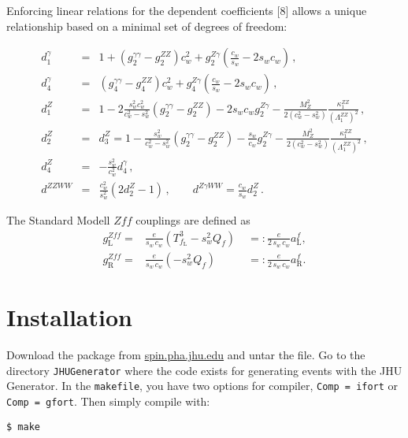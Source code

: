 \documentclass[aps,superscriptaddress,nofootinbib]{revtex4}
\begin{document}
Enforcing linear relations for the dependent coefficients [8] allows a unique relationship based on a minimal set of
degrees of freedom:

\begin{eqnarray}
  d_1^\gamma &=& 1 + (g_2^{\gamma\gamma}-g_2^{ZZ}) c_w^2  + g_2^{Z\gamma} \left(\frac{c_w}{s_w}-2s_w c_w \right)\,,
   \label{eq:d1}
  \\
  d_4^{\gamma} &=& (g_4^{\gamma\gamma}-g_4^{ZZ}) c_w^2 + g_4^{Z\gamma} \left( \frac{c_w}{s_w}-2 s_w c_w \right)\,,
   \label{eq:d2}
  \\
  d_1^Z &=& 1 -2 \frac{s_w^2 c_w^2}{c_w^2-s_w^2} \left(g_2^{\gamma\gamma}  -g_2^{ZZ} \right) -2 s_w c_w g_2^{Z\gamma} - \frac{M_Z^2}{2 (c_w^2-s_w^2) }  \frac{\kappa_1^{ZZ}}{(\Lambda_1^{ZZ})^2}\,,
   \label{eq:d3}
  \\
  d_2^Z &=& d_3^Z = 1 - \frac{s_w^2}{c_w^2-s_w^2} \left(g_2^{\gamma\gamma}-g_2^{ZZ} \right) - \frac{s_w}{c_w} g_2^{Z\gamma} - \frac{M_Z^2}{2(c_w^2-s_w^2)} \frac{\kappa_1^{ZZ}}{(\Lambda_1^{ZZ})^2}\,,
   \label{eq:d4}
  \\
  d_4^Z &=& -\frac{s_w^2}{c_w^2} d_4^{\gamma}\,,
   \label{eq:d5}
  \\
  d^{ZZWW} &=& \frac{c_w^2}{s_w^2} \left( 2 d_2^Z -1 \right)\,,
  \quad\quad
  d^{Z\gamma WW} = \frac{c_w}{s_w} d_2^Z\,.
   \label{eq:d6}
\end{eqnarray}


The Standard Modell $Zff$ couplings are defined as 
\begin{eqnarray}
	g_\mathrm{L}^{Zff} =& \frac{e}{s_w \,c_w} \left( T^3_{f_\mathrm{L}} - s_w^2 Q_f \right)  \; &=: \frac{e}{2\, s_w\, c_w} a_\mathrm{L}^f, \nonumber \\
	g_\mathrm{R}^{Zff} =& \frac{e}{s_w \,c_w} \left( - s_w^2 Q_f \right)  \; &=: \frac{e}{2\, s_w\, c_w} a_\mathrm{R}^f. 
	\label{eq:def:Zff}
\end{eqnarray}

\section{Installation}

\noindent
Download the package from \url{spin.pha.jhu.edu} and untar the file.  Go to the directory \verb|JHUGenerator| where the code exists for generating events with the JHU Generator. In the \verb|makefile|, you have two options for compiler, \verb|Comp = ifort| or \verb|Comp = gfort|.  Then simply compile with:
\begin{verbatim}
$ make
\end{verbatim}
\end{document}
